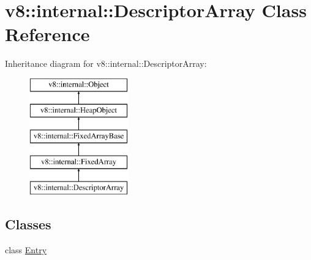 \hypertarget{classv8_1_1internal_1_1_descriptor_array}{}\section{v8\+:\+:internal\+:\+:Descriptor\+Array Class Reference}
\label{classv8_1_1internal_1_1_descriptor_array}
Inheritance diagram for v8\+:\+:internal\+:\+:Descriptor\+Array\+:\begin{figure}[H]
\begin{center}
\leavevmode
\includegraphics[height=5.000000cm]{classv8_1_1internal_1_1_descriptor_array}
\end{center}
\end{figure}
\subsection*{Classes}
\begin{DoxyCompactItemize}
\item 
class \hyperlink{classv8_1_1internal_1_1_descriptor_array_1_1_entry}{Entry}
\end{DoxyCompactItemize}
